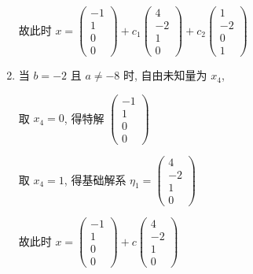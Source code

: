 \begin{enumerate}[label=\textcircled{\small \arabic*}]
                   故此时 \( x = \begin{pmatrix}
                       -1 \\
                       1  \\
                       0  \\
                       0
                   \end{pmatrix} + c_{1}\begin{pmatrix}
                       4  \\
                       -2 \\
                       1  \\
                       0
                   \end{pmatrix} + c_{2}\begin{pmatrix}
                       1  \\
                       -2 \\
                       0  \\
                       1
                   \end{pmatrix} \)
             \item
                   当 \(b=-2\) 且 \(a \neq -8\) 时, 自由未知量为 \(x_{4}\),

                   取 \(x_{4}=0\), 得特解 \( \begin{pmatrix}
                       -1 \\
                       1  \\
                       0  \\
                       0
                   \end{pmatrix} \)

                   取 \(x_{4}=1\), 得基础解系 \(\eta_{1} = \begin{pmatrix}
                       4  \\
                       -2 \\
                       1  \\
                       0
                   \end{pmatrix}\)

                   故此时 \(x=\begin{pmatrix}
                       -1 \\
                       1  \\
                       0  \\
                       0
                   \end{pmatrix} + c\begin{pmatrix}
                       4  \\
                       -2 \\
                       1  \\
                       0
                   \end{pmatrix}\)
         \end{enumerate}


